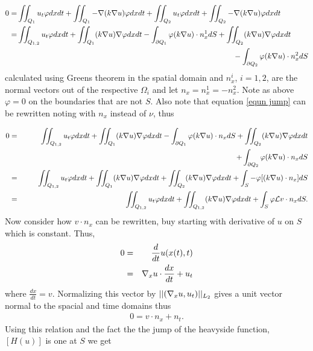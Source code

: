 \begin{align*}
0 =& \iint_{Q_1}  u_t\varphi dx dt  + \iint_{Q_1} - \grad(k \grad u) \varphi dx dt +\iint_{Q_2}  u_t\varphi dx dt  + \iint_{Q_2} - \grad(k \grad u) \varphi dx dt  \\*
=& \iint_{Q_{1,2}}  u_t\varphi dx dt  + \iint_{Q_1} (k \grad u) \grad\varphi dx dt - \int_{\partial Q_1} \varphi(k \grad u) \cdot n_x^1 dS +  \iint_{Q_2} (k \grad u) \grad\varphi dx dt \\*
&  \hspace{10cm}- \int_{\partial Q_2} \varphi (k \grad u)\cdot n^2_x  dS \\*
\end{align*}
calculated using Greens theorem in the spatial domain and $n_x^i$, $i=1,2$, are the normal vectors out of the respective $\Omega_i$ and let $n_x = n_x^1=-n_x^2$. Note as above $\varphi=0$ on the boundaries that are not $S$. Also note that equation \ref{equn jump} can be rewritten noting with $n_x$ instead of $\nu$, thus

\begin{eqnarray*}
0 &=& \iint_{Q_{1,2}}  u_t\varphi dx dt  + \iint_{Q_1} (k \grad u) \grad\varphi dx dt - \int_{\partial Q_1} \varphi(k \grad u) \cdot n_x dS + \iint_{Q_2} (k \grad u) \grad\varphi dx dt \\*
& & \hspace{10cm}+ \int_{\partial Q_2} \varphi (k \grad u)\cdot n_x  dS \\*
&=& \iint_{Q_{1,2}}  u_t\varphi dx dt  + \iint_{Q_1} (k \grad u) \grad\varphi dx dt + \iint_{Q_2} (k \grad u) \grad\varphi dx dt+ \int_{S} -\varphi[(k \grad u) \cdot n_x] dS  \\*
&=& \iint_{Q_{1,2}}  u_t\varphi dx dt  + \iint_{Q_{1,2}} (k \grad u) \grad\varphi dx dt +  \int_{S} \varphi \mathcal{L} v \cdot n_x dS.  
\end{eqnarray*}
Now consider how $v \cdot n_x$ can be rewritten, buy starting with derivative of $u$ on $S$ which is constant. Thus,
\begin{eqnarray}
0 &=& \frac{d}{dt} u(x(t),t)\\
&=& {\nabla}_x u \cdot \frac{dx}{dt} + u_t  
\end{eqnarray}
where $\frac{dx}{dt} = v$. Normalizing this vector by $||({\nabla}_x u, u_t)||_{L_2}$ gives a unit vector normal to the spacial and time domains thus
\begin{eqnarray}
0 = v \cdot n_x + n_t. 
\end{eqnarray}
Using this relation and the fact the the jump of the heavyside function, $[H(u)]$ is one at $S$ we get

